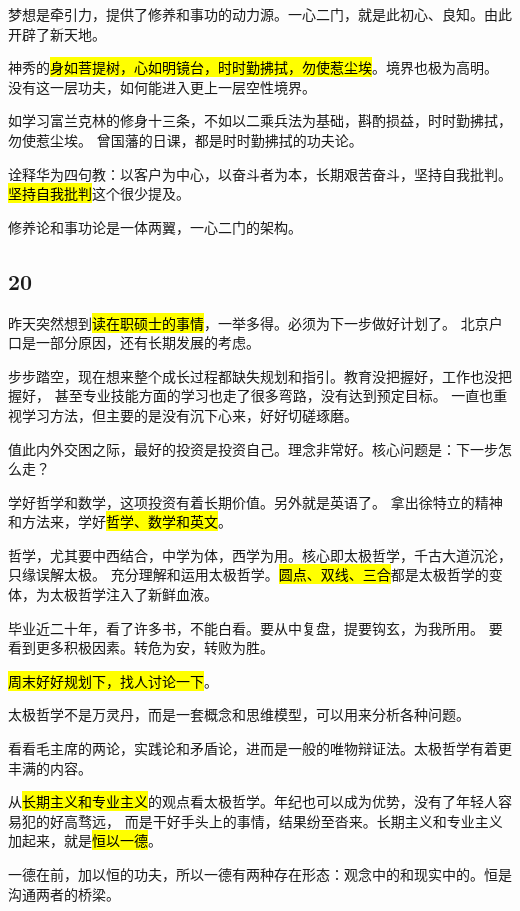 梦想是牵引力，提供了修养和事功的动力源。一心二门，就是此初心、良知。由此开辟了新天地。

神秀的\hl{身如菩提树，心如明镜台，时时勤拂拭，勿使惹尘埃}。境界也极为高明。
没有这一层功夫，如何能进入更上一层空性境界。

如学习富兰克林的修身十三条，不如以二乘兵法为基础，斟酌损益，时时勤拂拭，勿使惹尘埃。
曾国藩的日课，都是时时勤拂拭的功夫论。

诠释华为四句教：以客户为中心，以奋斗者为本，长期艰苦奋斗，坚持自我批判。
\hl{坚持自我批判}这个很少提及。

\hrulefill

修养论和事功论是一体两翼，一心二门的架构。

\subsection{20}

昨天突然想到\hl{读在职硕士的事情}，一举多得。必须为下一步做好计划了。
北京户口是一部分原因，还有长期发展的考虑。

步步踏空，现在想来整个成长过程都缺失规划和指引。教育没把握好，工作也没把握好，
甚至专业技能方面的学习也走了很多弯路，没有达到预定目标。
一直也重视学习方法，但主要的是没有沉下心来，好好切磋琢磨。

值此内外交困之际，最好的投资是投资自己。理念非常好。核心问题是：下一步怎么走？

学好哲学和数学，这项投资有着长期价值。另外就是英语了。
拿出徐特立的精神和方法来，学好\hl{哲学、数学和英文}。

哲学，尤其要中西结合，中学为体，西学为用。核心即太极哲学，千古大道沉沦，只缘误解太极。
充分理解和运用太极哲学。\hl{圆点、双线、三合}都是太极哲学的变体，为太极哲学注入了新鲜血液。

毕业近二十年，看了许多书，不能白看。要从中复盘，提要钩玄，为我所用。
要看到更多积极因素。转危为安，转败为胜。

\hl{周末好好规划下，找人讨论一下}。

\hrulefill

太极哲学不是万灵丹，而是一套概念和思维模型，可以用来分析各种问题。

看看毛主席的两论，实践论和矛盾论，进而是一般的唯物辩证法。太极哲学有着更丰满的内容。

从\hl{长期主义和专业主义}的观点看太极哲学。年纪也可以成为优势，没有了年轻人容易犯的好高骛远，
而是干好手头上的事情，结果纷至沓来。长期主义和专业主义加起来，就是\hl{恒以一德}。

一德在前，加以恒的功夫，所以一德有两种存在形态：观念中的和现实中的。恒是沟通两者的桥梁。


